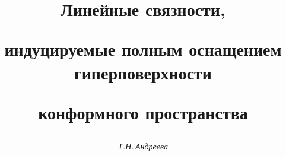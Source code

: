 

 


% 


 


\newcommand{\eqdef}{\overset{\mathrm{def}}{=}} 


\newcommand{\up}[2]{\overset{#1}{#2}{}} 


\renewcommand{\baselinestretch}{0.96}


 




\setcounter{page}{74} 












 


\author{\it Т.Н.\,Андреева} 




\title{Линейные связности, 


индуцируемые полным оснащением гиперповерхности 


конформного пространства} 


 


\date{} 




\pagestyle{plain} %


 




\maketitle 


